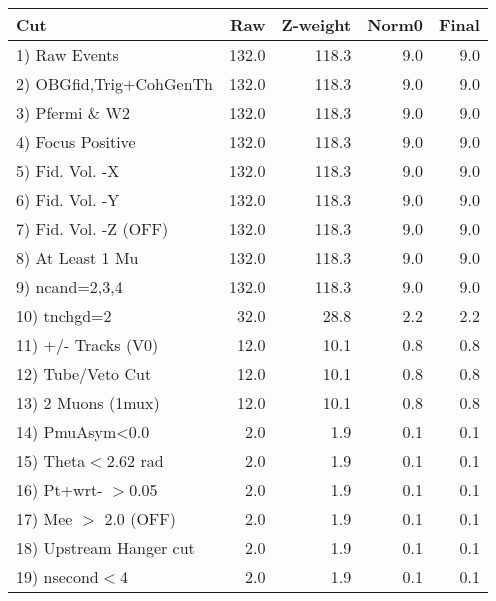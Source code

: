  \begin{table}[h!]\centering
 \begin{tabular}{||l||r|r|r|r||}
 \hline
 \hline
 Cut & Raw & Z-weight & Norm0 & Final \\
 \hline
  1) Raw Events           &       132.0 &       118.3 &         9.0 &         9.0 \\
  2) OBGfid,Trig+CohGenTh &       132.0 &       118.3 &         9.0 &         9.0 \\
  3) Pfermi \& W2         &       132.0 &       118.3 &         9.0 &         9.0 \\
  4) Focus Positive       &       132.0 &       118.3 &         9.0 &         9.0 \\
  5) Fid. Vol. -X         &       132.0 &       118.3 &         9.0 &         9.0 \\
  6) Fid. Vol. -Y         &       132.0 &       118.3 &         9.0 &         9.0 \\
  7) Fid. Vol. -Z (OFF)   &       132.0 &       118.3 &         9.0 &         9.0 \\
  8) At Least 1 Mu        &       132.0 &       118.3 &         9.0 &         9.0 \\
  9) ncand=2,3,4          &       132.0 &       118.3 &         9.0 &         9.0 \\
 10) tnchgd=2             &        32.0 &        28.8 &         2.2 &         2.2 \\
 11) +/- Tracks (V0)      &        12.0 &        10.1 &         0.8 &         0.8 \\
 12) Tube/Veto Cut        &        12.0 &        10.1 &         0.8 &         0.8 \\
 13) 2 Muons (1mux)       &        12.0 &        10.1 &         0.8 &         0.8 \\
 14) PmuAsym<0.0          &         2.0 &         1.9 &         0.1 &         0.1 \\
 15) Theta$<$2.62 rad     &         2.0 &         1.9 &         0.1 &         0.1 \\
 16) Pt+wrt- $>$0.05      &         2.0 &         1.9 &         0.1 &         0.1 \\
 17) Mee $>$ 2.0  (OFF)   &         2.0 &         1.9 &         0.1 &         0.1 \\
 18) Upstream Hanger cut  &         2.0 &         1.9 &         0.1 &         0.1 \\
 19) nsecond$<$4          &         2.0 &         1.9 &         0.1 &         0.1 \\

\end{tabular}
\end{table}
